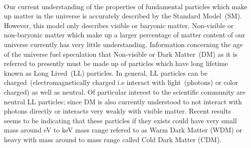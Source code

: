 \paragraph*{} 
Our current understanding of the properties of fundamental particles which make up matter in the universe is accurately described
by the Standard Model~(SM). However, this model only describes visible or baryonic matter. Non-visible or non-baryonic matter
which make up a larger percentage of matter content of our universe currently has very little understanding.  Information
concerning the age of the universe fuel speculation that Non-visible or Dark Matter~(DM) as it is referred to presently must be 
made up of particles which have long lifetime known as Long Lived~(LL) particles.  In general, LL particles can be charged~(electromagnetically charged i.e interact with light~(photons) or color charged) as well as neutral.
\newline
Of particular interest to the scientific community are neutral LL particles; since DM is also currently understood to not interact with photons  directly or interacts very weakly with visible matter.  Recent results seems to be indicating that these particles  if they exists could have very small mass around eV to keV mass range refered to as Warm Dark Matter (WDM) or heavy with mass around \GeV to \TeV mass range called Cold Dark Matter (CDM).
